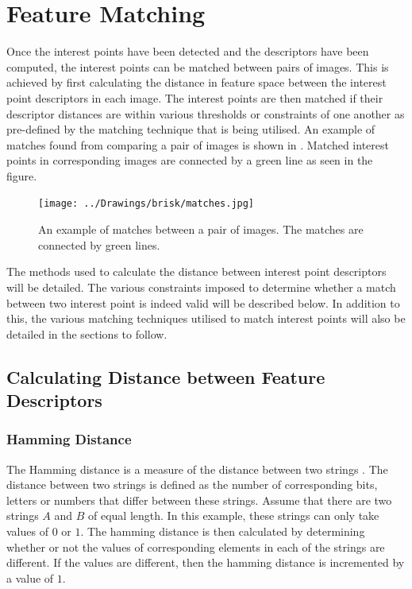 \documentclass[11pt]{report}
\begin{document}
\chapter{Feature Matching}
\label{sec:matching}
Once the interest points have been detected and the descriptors have been computed, the interest points can be matched between pairs of images. This is achieved by first calculating the distance in feature space between the interest point descriptors in each image. The interest points are then matched if their descriptor distances are within various thresholds or constraints of one another as pre-defined by the matching technique that is being utilised. An example of matches found from comparing a pair of images is shown in . Matched interest points in corresponding images are connected by a green line as seen in the figure.\\

\begin{figure}[h!] 
  \centering
    \texttt{[image: ../Drawings/brisk/matches.jpg]}
    \caption{An example of matches between a pair of images. The matches are connected by green lines.}
    \label{fig:matchesIntro}
\end{figure}

The methods used to calculate the distance between interest point descriptors will be detailed. The various constraints imposed to determine whether a match between two interest point is indeed valid will be described below. In addition to this, the various matching techniques utilised to match interest points will also be detailed in the sections to follow.\\

\section{Calculating Distance between Feature Descriptors}
\label{sec:distance}

\subsection{Hamming Distance}
\label{sec:hamming}
The Hamming distance is a measure of the distance between two strings \cite{Banzal2007}. The distance between two strings is defined as the number of corresponding bits, letters or numbers that differ between these strings. Assume that there are two strings $A$ and $B$ of equal length. In this example, these strings can only take values of $0$ or $1$. The hamming distance is then calculated by determining whether or not the values of corresponding elements in each of the strings are different. If the values are different, then the hamming distance is incremented by a value of $1$.\\
\end{document}
